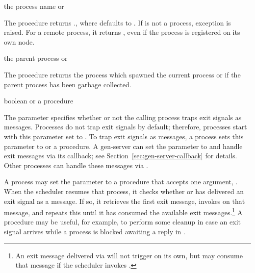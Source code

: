 \begin{procedure}
\end{procedure}
\returns{} the process name or 

The  procedure returns .,
where  defaults to . If  is not a
process, exception  is
raised. For a remote process, it returns , even if the
process is registered on its own node.

\begin{procedure}
\end{procedure}
\returns{} the parent process or 

The  procedure returns the process which spawned
the current process or  if the parent process has been
garbage collected.

\begin{parameter}
\end{parameter}
\hasvalue{} boolean or a procedure

The  parameter specifies whether or not the
calling process traps exit signals as messages.
Processes do not trap exit signals by default; therefore,
processes start with this parameter set to .
To trap exit signals as messages, a process sets this parameter
to  or a procedure.
A gen-server can set the parameter to  and handle exit messages
via its  callback; see Section~\ref{sec:gen-server-callback} for details.
Other processes can handle these messages via .

A process may set the  parameter to a 
procedure that accepts one argument, .
When the scheduler resumes that process, it checks whether  or
 has delivered an exit signal as a message.
If so, it retrieves the first exit message, invokes  on that
message, and repeats this until it has consumed the available exit messages.\footnote{An exit message delivered via  will not trigger  on its own, but  may consume that message if
the scheduler invokes .}
A  procedure may be useful, for example, to perform some cleanup
in case an exit signal arrives while a process is blocked awaiting a reply in
.


